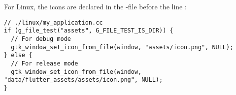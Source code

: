 \noindent For Linux, the icons are declared in the -file before the line 
:

\begin{lstlisting}
// ./linux/my_application.cc
if (g_file_test("assets", G_FILE_TEST_IS_DIR)) {
  // For debug mode
  gtk_window_set_icon_from_file(window, "assets/icon.png", NULL); 
} else {
  // For release mode
  gtk_window_set_icon_from_file(window, "data/flutter_assets/assets/icon.png", NULL);
}
\end{lstlisting}
